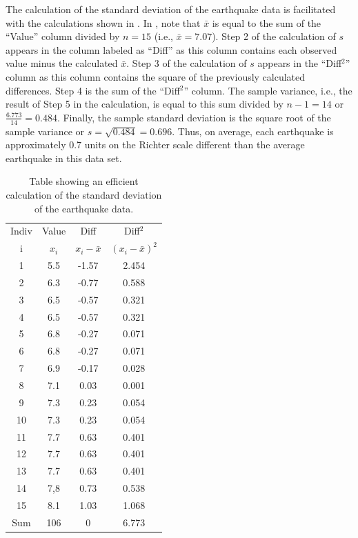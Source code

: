 \documentclass[10pt,openany]{book}\usepackage[]{graphicx}\usepackage[]{color}
\begin{document}
The calculation of the standard deviation of the earthquake data  is facilitated with the calculations shown in .  In , note that $\bar{x}$ is equal to the sum of the ``Value'' column divided by $n=15$ (i.e., $\bar{x}=7.07$).  Step 2 of the calculation of $s$ appears in the column labeled as ``Diff'' as this column contains each observed value minus the calculated $\bar{x}$.  Step 3 of the calculation of $s$ appears in the ``Diff$^2$'' column as this column contains the square of the previously calculated differences.  Step 4 is the sum of the ``Diff$^2$'' column.  The sample variance, i.e., the result of Step 5 in the calculation, is equal to this sum divided by $n-1=14$ or $\frac{6.773}{14}=0.484$.  Finally, the sample standard deviation is the square root of the sample variance or $s=\sqrt{0.484}=0.696$.  Thus, on average, each earthquake is approximately 0.7 units on the Richter scale different than the average earthquake in this data set.

\begin{table}[htbp]
  \caption{Table showing an efficient calculation of the standard deviation of the earthquake data.}
  \label{tab:SDCalc}
    \centering
    \begin{tabular}{cccc}
\hline\hline
Indiv & Value & Diff & Diff$^2$ \\
i & $x_{i}$ & $x_{i}-\bar{x}$ & $(x_{i}-\bar{x})^{2}$ \\
\hline
1 & 5.5 & -1.57 & 2.454 \\
2 & 6.3 & -0.77 & 0.588 \\
3 & 6.5 & -0.57 & 0.321 \\
4 & 6.5 & -0.57 & 0.321 \\
5 & 6.8 & -0.27 & 0.071 \\
6 & 6.8 & -0.27 & 0.071 \\
7 & 6.9 & -0.17 & 0.028 \\
8 & 7.1 & 0.03 & 0.001 \\
9 & 7.3 & 0.23 & 0.054 \\
10 & 7.3 & 0.23 & 0.054 \\
11 & 7.7 & 0.63 & 0.401 \\
12 & 7.7 & 0.63 & 0.401 \\
13 & 7.7 & 0.63 & 0.401 \\
14 & 7,8 & 0.73 & 0.538 \\
15 & 8.1 & 1.03 & 1.068 \\
\hline
Sum & 106 & 0 & 6.773 \\
\hline\hline
    \end{tabular}
\end{table}
\end{document}
